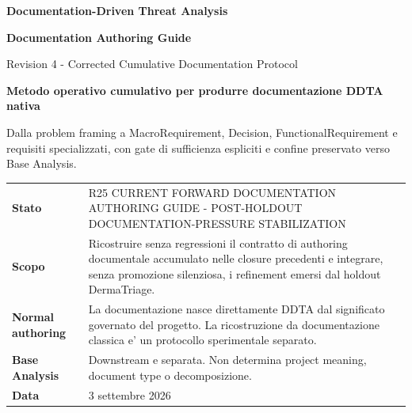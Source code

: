 \documentclass[11pt,a4paper]{article}
\begin{document}

\begin{titlepage}
\thispagestyle{empty}
\vspace*{8mm}

{\sffamily\bfseries\color{DDTANavy}\fontsize{15}{18}\selectfont Documentation-Driven Threat Analysis}\par
\vspace{5mm}
{\sffamily\bfseries\color{DDTANavy}\fontsize{30}{34}\selectfont Documentation Authoring Guide}\par
\vspace{2mm}
{\sffamily\color{DDTABlue}\fontsize{19}{23}\selectfont Revision 4 - Corrected Cumulative Documentation Protocol}\par

\vspace{10mm}
\begin{tcolorbox}[enhanced,arc=3pt,boxrule=0pt,colback=DDTANavy,left=12pt,right=12pt,top=11pt,bottom=11pt]
{\color{white}\sffamily\bfseries\large Metodo operativo cumulativo per produrre documentazione DDTA nativa}\par
\vspace{2mm}
{\color{white!88}\small Dalla problem framing a MacroRequirement, Decision, FunctionalRequirement e requisiti specializzati, con gate di sufficienza espliciti e confine preservato verso Base Analysis.}
\end{tcolorbox}

\vspace{8mm}
\begin{tabularx}{\textwidth}{L{42mm}Y}
\toprule
\textbf{Stato} & R25 CURRENT FORWARD DOCUMENTATION AUTHORING GUIDE - POST-HOLDOUT DOCUMENTATION-PRESSURE STABILIZATION \\
\textbf{Scopo} & Ricostruire senza regressioni il contratto di authoring documentale accumulato nelle closure precedenti e integrare, senza promozione silenziosa, i refinement emersi dal holdout DermaTriage. \\
\textbf{Normal authoring} & La documentazione nasce direttamente DDTA dal significato governato del progetto. La ricostruzione da documentazione classica e' un protocollo sperimentale separato. \\
\textbf{Base Analysis} & Downstream e separata. Non determina project meaning, document type o decomposizione. \\
\textbf{Data} & 3 settembre 2026 \\
\bottomrule
\end{tabularx}


\end{titlepage}
\end{document}
